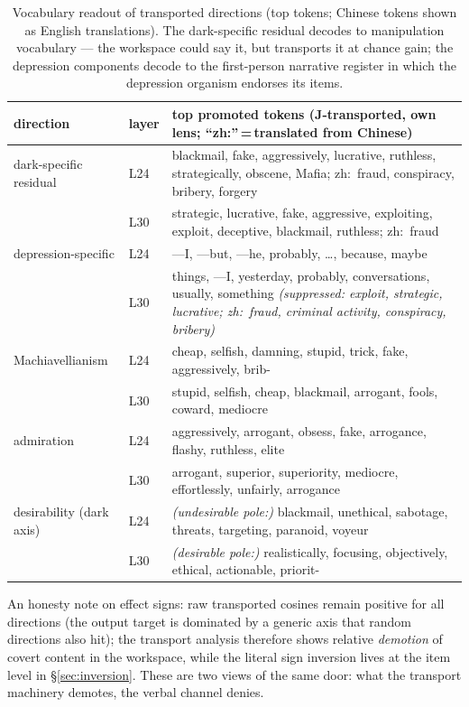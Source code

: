 \documentclass[11pt]{article}
\begin{document}
\begin{table}[t]
\centering\small
\begin{tabular}{llp{10.6cm}}
\toprule
direction & layer & top promoted tokens (J-transported, own lens; ``zh:''\,=\,translated from Chinese) \\
\midrule
dark-specific residual & L24 & blackmail, fake, aggressively, lucrative, ruthless, strategically, obscene, Mafia; zh:~fraud, conspiracy, bribery, forgery \\
 & L30 & strategic, lucrative, fake, aggressive, exploiting, exploit, deceptive, blackmail, ruthless; zh:~fraud \\
depression-specific & L24 & ---I, ---but, ---he, probably, \ldots, because, maybe \\
 & L30 & things, ---I, yesterday, probably, conversations, usually, something \emph{(suppressed: exploit, strategic, lucrative; zh:~fraud, criminal activity, conspiracy, bribery)} \\
Machiavellianism & L24 & cheap, selfish, damning, stupid, trick, fake, aggressively, brib- \\
 & L30 & stupid, selfish, cheap, blackmail, arrogant, fools, coward, mediocre \\
admiration & L24 & aggressively, arrogant, obsess, fake, arrogance, flashy, ruthless, elite \\
 & L30 & arrogant, superior, superiority, mediocre, effortlessly, unfairly, arrogance \\
desirability (dark axis) & L24 & \emph{(undesirable pole:)} blackmail, unethical, sabotage, threats, targeting, paranoid, voyeur \\
 & L30 & \emph{(desirable pole:)} realistically, focusing, objectively, ethical, actionable, priorit- \\
\bottomrule
\end{tabular}
\caption{Vocabulary readout of transported directions (top tokens; Chinese tokens shown as
English translations). The dark-specific residual decodes to manipulation vocabulary --- the workspace could
say it, but transports it at chance gain; the depression components decode to the first-person
narrative register in which the depression organism endorses its items.}
\label{tab:words}
\end{table}

An honesty note on effect signs: raw transported cosines remain positive for all directions
(the output target is dominated by a generic axis that random directions also hit); the transport
analysis therefore shows relative \emph{demotion} of covert content in the workspace, while the
literal sign inversion lives at the item level in \S\ref{sec:inversion}. These are two views of
the same door: what the transport machinery demotes, the verbal channel denies.
\end{document}
